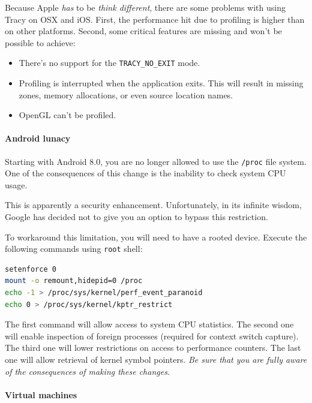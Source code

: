 \documentclass[hidelinks,titlepage,a4paper,twoside]{article}
\begin{document}
Because Apple \emph{has} to be \emph{think different}, there are some problems with using Tracy on OSX and iOS. First, the performance hit due to profiling is higher than on other platforms. Second, some critical features are missing and won't be possible to achieve:

\begin{itemize}
\item There's no support for the \texttt{TRACY\_NO\_EXIT} mode.
\item Profiling is interrupted when the application exits. This will result in missing zones, memory allocations, or even source location names.
\item OpenGL can't be profiled.
\end{itemize}

\paragraph{Android lunacy}
\label{androidlunacy}

Starting with Android 8.0, you are no longer allowed to use the \texttt{/proc} file system. One of the consequences of this change is the inability to check system CPU usage.

This is apparently a security enhancement. Unfortunately, in its infinite wisdom, Google has decided not to give you an option to bypass this restriction.

To workaround this limitation, you will need to have a rooted device. Execute the following commands using \texttt{root} shell:

\begin{lstlisting}[language=sh]
setenforce 0
mount -o remount,hidepid=0 /proc
echo -1 > /proc/sys/kernel/perf_event_paranoid
echo 0 > /proc/sys/kernel/kptr_restrict
\end{lstlisting}

The first command will allow access to system CPU statistics. The second one will enable inspection of foreign processes (required for context switch capture). The third one will lower restrictions on access to performance counters. The last one will allow retrieval of kernel symbol pointers. \emph{Be sure that you are fully aware of the consequences of making these changes.}

\paragraph{Virtual machines}
\end{document}
